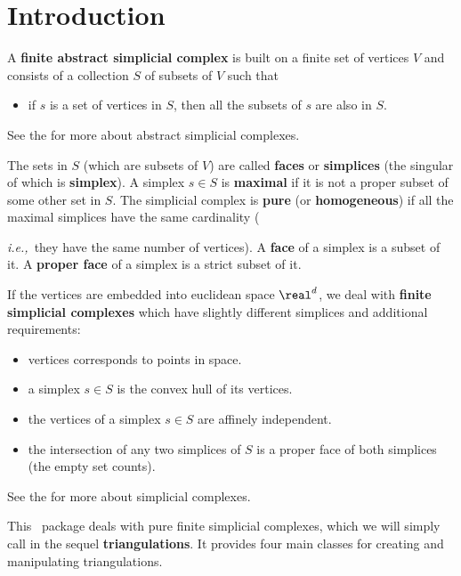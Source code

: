 {

\def\note#1{
  {\marginpar%
    [\hfill\llap{\textcircled{\small{$\circledcirc$}}$\!\Longrightarrow$}]%
    {\rlap{$\Longleftarrow\!$\textcircled{\small{$\circledcirc$}}}}} {\color{red}
  \textsf{$\langle\!\langle${#1}$\rangle\!\rangle$}}%
}

\section{Introduction\label{triangulation:intro}}

A \textbf{finite abstract simplicial complex} is built on a finite set of
vertices $V$ and consists of a collection $S$ of subsets of $V$ such that
\begin{itemize}
\item if $s$ is a set of vertices in $S$, then all the subsets of $s$ are also
in $S$.
\end{itemize}
See the
 for more about abstract simplicial complexes.

The sets in $S$ (which are subsets of $V$) are called
\textbf{faces} or \textbf{simplices} (the
singular of which is \textbf{simplex}).
%
A simplex $s\in S$ is \textbf{maximal} if it is not a proper subset of some other
set in $S$. The simplicial complex is \textbf{pure} (or \textbf{homogeneous})
if all the maximal simplices have the same cardinality ({\emph{i.e.,}\ they have the same
number of vertices). A \textbf{face} of a simplex is a subset of it. A
\textbf{proper face} of a simplex is a strict subset of it.

If the vertices are embedded into euclidean space $\real^d$, we deal with
\textbf{finite simplicial complexes} which have slightly different simplices
and additional requirements:
\begin{itemize}
\item vertices corresponds to points in space.
\item a simplex $s\in S$ is the convex hull of its vertices.
\item the vertices of a simplex $s\in S$ are affinely independent.
\item the intersection of any two simplices of $S$ is a proper face of both
simplices (the empty set counts).
\end{itemize}
See the  for more about simplicial complexes.

This \cgal\ package deals with pure finite simplicial complexes, which
we will simply call in the sequel \textbf{triangulations}. It provides four main classes
for creating and manipulating triangulations.

}}

